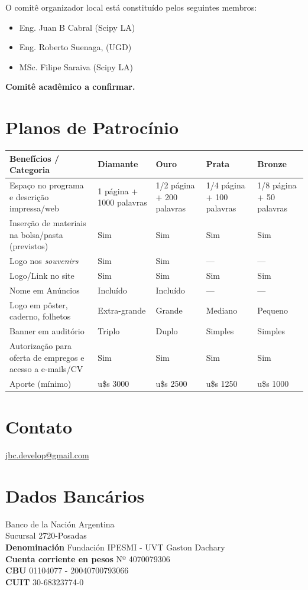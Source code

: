 \documentclass[11pt,a4paper]{report}
\begin{document}
O comitê organizador local está constituído pelos seguintes membros:\\

\begin{itemize}[nolistsep]
    \item Eng. Juan B Cabral (Scipy LA)
    \item Eng. Roberto Suenaga, (UGD)
    \item MSc. Filipe Saraiva (Scipy LA)
\end{itemize}

\textbf{Comitê acadêmico a confirmar.}

\section*{Planos de Patrocínio}
\begin{center}

\begin{tabular}{|p{4cm}|p{2.5cm}|p{2.5cm}|p{2.5cm}|p{2.5cm}|}
\hline
Benefícios / Categoria & Diamante & Ouro  & Prata & Bronze \\
\hline
Espaço no programa e descrição impressa/web & 1 página +
1000 palavras & 1/2 página + 200 palavras & 1/4 página + 100 palavras &  1/8 página + 50 palavras\\
\hline
Inserção de materiais na bolsa/pasta (previstos) & Sim & Sim & Sim & Sim \\
\hline
Logo nos \textit{souvenirs} & Sim & Sim & --- & --- \\
\hline
Logo/Link no site & Sim & Sim & Sim & Sim \\
\hline
Nome em Anúncios & Incluído & Incluído & --- & --- \\
\hline
Logo em pôster, caderno, folhetos & Extra-grande & Grande & Mediano & Pequeno \\
\hline
Banner em auditório & Triplo & Duplo & Simples & Simples \\
\hline
Autorização para oferta de empregos e acesso a e-mails/CV & Sim & Sim & Sim & Sim \\
\hline
Aporte (mínimo) & u\$s 3000 & u\$s 2500 & u\$s 1250 & u\$s 1000\\
\hline
\end{tabular}
\end{center}

\section*{Contato}
\noindent \href{mailto:jbc.develop@gmail.com}{jbc.develop@gmail.com}

\section*{Dados Bancários}
\noindent Banco de la Nación Argentina \\
Sucursal 2720-Posadas \\
\textbf{Denominación} Fundación IPESMI - UVT Gaston Dachary \\
\textbf{Cuenta corriente en pesos} Nº 4070079306 \\
\textbf{CBU} 01104077 - 20040700793066 \\
\textbf{CUIT} 30-68323774-0 \\
\end{document}
